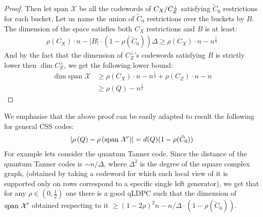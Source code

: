 \documentclass[manuscript,screen,review]{acmart}
\begin{document}
\begin{proof}
  Then let $\text{span }\mathcal{X}$ be all the codewords of $C_{X}/C_{Z}^\perp$ satisfying $\tilde{C}_{0}$ restrictions for each bucket, Let us name the union of $\tilde{C}_{0}$ restrictions over the buckets by $B$. The dimension of the space satisfies both $C_{X}$ restrictions and $B$ is at least:
  \begin{equation*}
    \begin{split}
      \rho(C_{X})\cdot n - |B|\cdot (1 - \rho(\tilde{C}_{0}))\Delta \ge \rho(C_{X})\cdot n - n^{\frac{1}{4}}
    \end{split}
  \end{equation*}
  And by the fact that the dimension of $C_{Z}^\perp$'s codewords satisfying $B$ is strictly lower then $\dim C_{Z}^\perp$, we get the following lower bound:
  \begin{equation*}
    \begin{split}
      \dim \text{span } \mathcal{X} & \ge \rho(C_{X})\cdot n - n^{\frac{1}{4}} + \rho(C_{Z})\cdot n - n \\
     & \ge \rho (Q) - n^{\frac{1}{4}}
    \end{split}
  \end{equation*}
\end{proof}

\begin{remark}
  We emphasise that the above proof can be easily adapted to result the following for general CSS codes: 
\begin{equation*}
    \begin{split}
      \left| \rho\left(Q\right) - \rho\left(\text{span }\mathcal{X}^\prime\right) \right| = d(Q)(1 - \rho(\tilde{C}_{0}))
    \end{split}
  \end{equation*}
  For example lets consider the quantum Tanner code. Since the distance of the quantum Tanner codes is $\sim n/\Delta$, where $\Delta^{2}$ is the degree of the square complex graph, (obtained by taking a codeword for which each local view of it is supported only on rows correspond to a specific single left generator), we get that for any $\rho \in (0,\frac{1}{2})$ one there is a good qLDPC such that the dimension of $\text{span }\mathcal{X}^\prime$ obtained respecting to it $\ge (1-2\rho)^{2}n - n/\Delta \cdot (1 - \rho(\tilde{C}_{0}))$.  
\end{remark}
\end{document}
